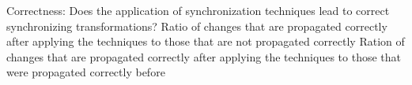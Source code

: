 {Correctness: Does the application of synchronization techniques lead to correct synchronizing transformations?}
{Ratio of changes that are propagated correctly after applying the techniques to those that are not propagated correctly}
{Ration of changes that are propagated correctly after applying the techniques to those that were propagated correctly before}



